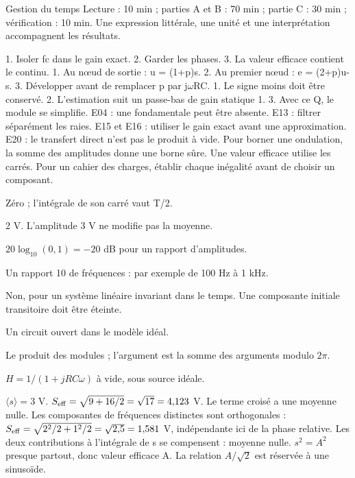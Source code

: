 \begin{docu}{Gestion du temps}
Lecture : 10 min ; parties A et B : 70 min ; partie C : 30 min ; vérification : 10 min. Une expression littérale, une unité et une interprétation accompagnent les résultats.
\end{docu}


1. Isoler fc dans le gain exact. 2. Garder les phases. 3. La valeur efficace contient le continu.
1. Au nœud de sortie : u = (1+p)s. 2. Au premier nœud : e = (2+p)u-s. 3. Développer avant de remplacer p par j\ensuremath{\omega}RC.
1. Le signe moins doit être conservé. 2. L’estimation suit un passe-bas de gain statique 1. 3. Avec ce Q, le module se simplifie.
E04 : une fondamentale peut être absente. E13 : filtrer séparément les raies. E15 et E16 : utiliser le gain exact avant une approximation. E20 : le transfert direct n’est pas le produit à vide.
Pour borner une ondulation, la somme des amplitudes donne une borne sûre. Une valeur efficace utilise les carrés. Pour un cahier des charges, établir chaque inégalité avant de choisir un composant.


Zéro ; l’intégrale de son carré vaut T/2.

2 V. L’amplitude 3 V ne modifie pas la moyenne.

$20\log_{10}(0{,}1)=-20$ dB pour un rapport d’amplitudes.

Un rapport 10 de fréquences : par exemple de 100 Hz à 1 kHz.

Non, pour un système linéaire invariant dans le temps. Une composante initiale transitoire doit être éteinte.

Un circuit ouvert dans le modèle idéal.

Le produit des modules ; l’argument est la somme des arguments modulo $2\pi$.

$H=1/(1+jRC\omega)$ à vide, sous source idéale.


$\langle s\rangle=3$ V. $S_{\rm eff}=\sqrt{9+16/2}=\sqrt{17}=4{,}123$ V. Le terme croisé a une moyenne nulle.
Les composantes de fréquences distinctes sont orthogonales : $S_{\rm eff}=\sqrt{2^2/2+1^2/2}=\sqrt{2{,}5}=1{,}581$ V, indépendante ici de la phase relative.
Les deux contributions à l’intégrale de s se compensent : moyenne nulle. $s^2=A^2$ presque partout, donc valeur efficace A. La relation $A/\sqrt2$ est réservée à une sinusoïde.


